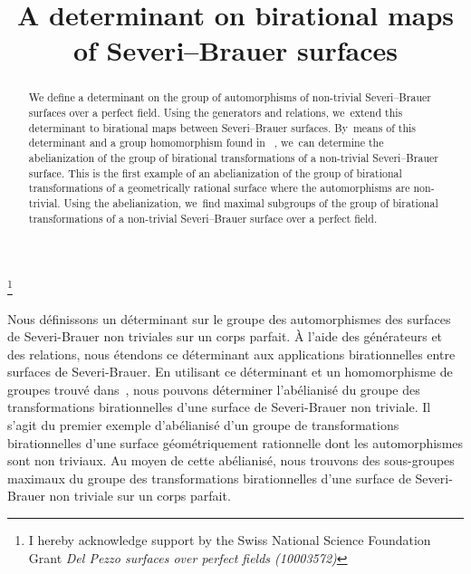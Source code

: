 \documentclass[JEP,XML,SOM,Unicode,NoFloatCountersInSection, NoEqCountersInSection,published]{cedram}
\theoremstyle{definition}
\begin{document}
\frontmatter
\title[Severi--Brauer surfaces]{A determinant on birational maps of Severi--Brauer surfaces}

\author[\initial{E.} \lastname{Kurz}]{ }
\address{Université de Neuchâtel, Institut de Mathématiques,\\
Rue Émile-Argand 11, Switzerland}
\urladdr{}

\thanks{I hereby acknowledge support by the Swiss National Science Foundation Grant \textit{Del Pezzo surfaces over perfect fields (10003572)}}

\begin{abstract}
We define a determinant on the group of automorphisms of non-trivial Severi--Brauer surfaces over a perfect field. Using the generators and relations, we~extend this determinant to birational maps between Severi--Brauer surfaces. By~means of this determinant and a group homomorphism found in ~\cite{BSY}, we~can determine the abelianization of the group of birational transformations of a non-trivial Severi--Brauer surface. This is the first example of an abelianization of the group of birational transformations of a geometrically rational surface where the automorphisms are non-trivial. Using the abelianization, we~find maximal subgroups of the group of birational transformations of a non-trivial Severi--Brauer surface over a perfect field.
\end{abstract}





\begin{altabstract}
Nous définissons un déterminant sur le groupe des automorphismes des surfaces de Severi-Brauer non triviales sur un corps parfait. À l’aide des générateurs et des relations, nous étendons ce déterminant aux applications birationnelles entre surfaces de Severi-Brauer. En utilisant ce déterminant et un homomorphisme de groupes trouvé dans~\cite{BSY}, nous pouvons déterminer l’abélianisé du groupe des transformations birationnelles d’une surface de Severi-Brauer non triviale. Il s’agit du premier exemple d’abélianisé d'un groupe de transformations birationnelles d’une surface géométriquement rationnelle dont les automorphismes sont non triviaux. Au moyen de cette abélianisé, nous trouvons des sous-groupes maximaux du groupe des transformations birationnelles d’une surface de Severi-Brauer non triviale sur un corps parfait.
\end{altabstract}
\end{document}
